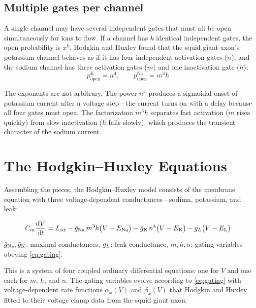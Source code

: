 \subsection{Multiple gates per channel}

A single channel may have several independent gates that must all be open simultaneously for ions to flow. If a channel has $k$ identical independent gates, the open probability is $x^k$. Hodgkin and Huxley found that the squid giant axon's potassium channel behaves as if it has four independent activation gates ($n$), and the sodium channel has three activation gates ($m$) and one inactivation gate ($h$):
%
\begin{equation}
  p_{\text{open}}^{\text{K}} = n^4, \qquad
  p_{\text{open}}^{\text{Na}} = m^3 h
  \label{eq:hh-gating-powers}
\end{equation}

\noindent The exponents are not arbitrary. The power $n^4$ produces a sigmoidal onset of potassium current after a voltage step---the current turns on with a delay because all four gates must open. The factorization $m^3 h$ separates fast activation ($m$ rises quickly) from slow inactivation ($h$ falls slowly), which produces the transient character of the sodium current.

\section{The Hodgkin--Huxley Equations}
\label{sec:hh-equations}

Assembling the pieces, the Hodgkin--Huxley model consists of the membrane equation with three voltage-dependent conductances---sodium, potassium, and leak:

\begin{keyequation}
\begin{equation}
  C_m\frac{\mathop{}\!\mathrm{d} V}{\mathop{}\!\mathrm{d} t} = I_{\text{ext}} - \bar{g}_{\mathrm{Na}}\,m^3 h\bigl(V - E_{\mathrm{Na}}\bigr) - \bar{g}_{\mathrm{K}}\,n^4\bigl(V - E_{\mathrm{K}}\bigr) - g_L\bigl(V - E_{\mathrm{L}}\bigr)
  \label{eq:hh}
\end{equation}
\tcblower
$\bar{g}_{\mathrm{Na}}, \bar{g}_{\mathrm{K}}$: maximal conductances, \quad
$g_L$: leak conductance, \quad
$m, h, n$: gating variables obeying \cref{eq:gating}.
\end{keyequation}

\noindent This is a system of four coupled ordinary differential equations: one for $V$ and one each for $m$, $h$, and $n$. The gating variables evolve according to \cref{eq:gating} with voltage-dependent rate functions $\alpha_x(V)$ and $\beta_x(V)$ that Hodgkin and Huxley fitted to their voltage clamp data from the squid giant axon.

